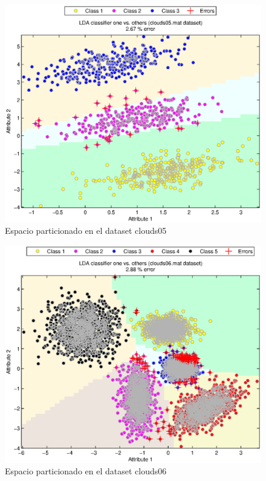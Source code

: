 \documentclass[journal]{IEEEtran}
\begin{document}
\begin{figure}[tb]
	\begin{center}
		\includegraphics[width=\columnwidth]{imagenes/clouds05}
	\end{center}
	\caption{Espacio particionado en el dataset clouds05}
	\label{fig:lda-dataset-05}
\end{figure}

\begin{figure}[tb]
	\begin{center}
		\includegraphics[width=\columnwidth]{imagenes/clouds06}
	\end{center}
	\caption{Espacio particionado en el dataset clouds06}
	\label{fig:lda-dataset-06}
\end{figure}
\end{document}

